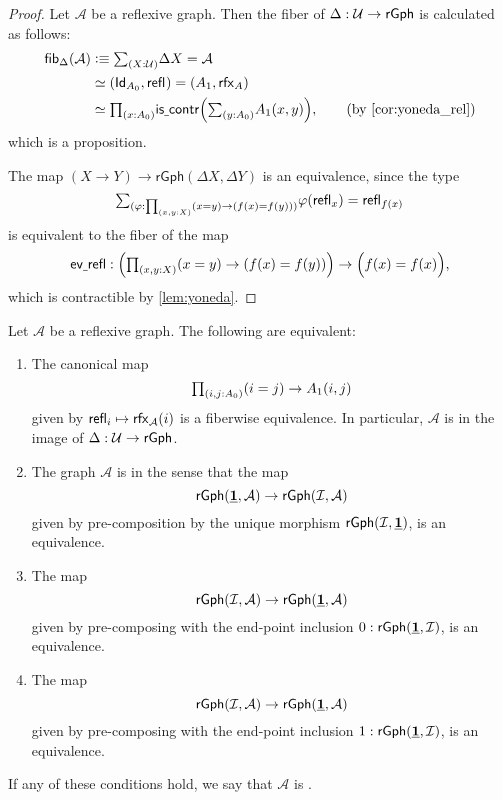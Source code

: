 \begin{proof}
Let $\mathcal{A}$ be a reflexive graph. Then the fiber of $\Delta:\mathcal{U}\to\mathsf{rGph}$ is calculated as follows:
\begin{align*}
\fib{\Delta}{\mathcal{A}} & \defeq \sm{X:\UU} \Delta X = \mathcal{A} \\
& \eqvsym (\idtypevar{\pts{A}},\refl{})=(\edg{A},\rfx{A}) \\
& \eqvsym \prd{x:\pts{A}}\iscontr\Big(\sm{y:\pts{A}}\edg{A}(x,y)\Big),\tag{by \cref{cor:yoneda_rel}}
\end{align*}
which is a proposition.

The map $(X\to Y)\to \mathsf{rGph}(\Delta X,\Delta Y)$ is an equivalence, since the type
\begin{equation*}
\sm{\varphi:\prd{x,y:X}(x=y)\to (f(x)=f(y))}\varphi(\refl{x})=\refl{f(x)}
\end{equation*}
is equivalent to the fiber of the map
\begin{equation*}
\mathsf{ev\usc{}refl} : \Big(\prd{x,y:X}(x=y)\to (f(x)=f(y))\Big)\to \Big(f(x)=f(x)\Big),
\end{equation*}
which is contractible by \cref{lem:yoneda}.
\end{proof}

\begin{thm}\label{thm:discrete_rgraph}
Let $\mathcal{A}$ be a reflexive graph. The following are equivalent:
\begin{enumerate}
\item The canonical map
\begin{equation*}
\prd{i,j:\pts{A}} (i=j)\to \edg{A}(i,j)
\end{equation*}
given by $\refl{i}\mapsto \rfx{\mathcal{A}}(i)$ is a fiberwise equivalence. In particular, $\mathcal{A}$ is in the image of $\Delta:\mathcal{U}\to\mathsf{rGph}$. 
\item The graph $\mathcal{A}$ is  in the sense that the map
\begin{equation*}
\mathsf{rGph}(\underline{\mathbf{1}},\mathcal{A}) \to \mathsf{rGph}(\mathcal{I},\mathcal{A})
\end{equation*}
given by pre-composition by the unique morphism $\mathsf{rGph}(\mathcal{I},\underline{\mathbf{1}})$, is an equivalence.
\item The map
\begin{equation*}
\mathsf{rGph}(\mathcal{I},\mathcal{A})\to \mathsf{rGph}(\underline{\mathbf{1}},\mathcal{A})
\end{equation*}
given by pre-composing with the end-point inclusion $0:\mathsf{rGph}(\underline{\mathbf{1}},\mathcal{I})$, is an equivalence.
\item The map
\begin{equation*}
\mathsf{rGph}(\mathcal{I},\mathcal{A})\to \mathsf{rGph}(\underline{\mathbf{1}},\mathcal{A})
\end{equation*}
given by pre-composing with the end-point inclusion $1:\mathsf{rGph}(\underline{\mathbf{1}},\mathcal{I})$, is an equivalence.
\end{enumerate}
If any of these conditions hold, we say that $\mathcal{A}$ is .
\end{thm}

